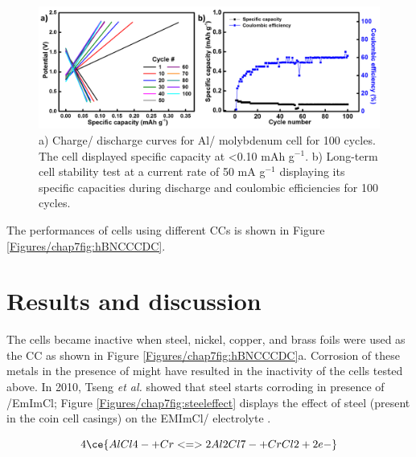 \begin{figure}[tbh!]
\centering
\includegraphics[width=\textwidth]{Figures/chap7fig/blankmo}
\caption{a) Charge/ discharge curves for Al/ molybdenum cell for 100 cycles. The cell displayed specific capacity at <0.10 mAh g$^{-1}$. b) Long-term cell stability test at a current rate of 50 mA g$^{-1}$ displaying its specific capacities during discharge and coulombic efficiencies for 100 cycles.}
\label{Figures/chap7fig:blankmo}
\end{figure}

The performances of cells using different CCs is shown in Figure \ref{Figures/chap7fig:hBNCCCDC}. 

\section{Results and discussion}
The cells became inactive when steel, nickel, copper, and brass foils were used as the CC as shown in Figure \ref{Figures/chap7fig:hBNCCCDC}a. Corrosion of these metals in the presence of  might have resulted in the inactivity of the cells tested above. In 2010, Tseng \textit{et al.} showed that steel starts corroding in presence of /EmImCl; Figure \ref{Figures/chap7fig:steeleffect} displays the effect of steel (present in the coin cell casings) on the EMImCl/ electrolyte \cite{reed_roles_2013, tseng_corrosion_2010}. 

\begin{equation}
4\ce{AlCl4- + Cr <=> 2Al2Cl7- + CrCl2 + 2e-} 
\end{equation}

